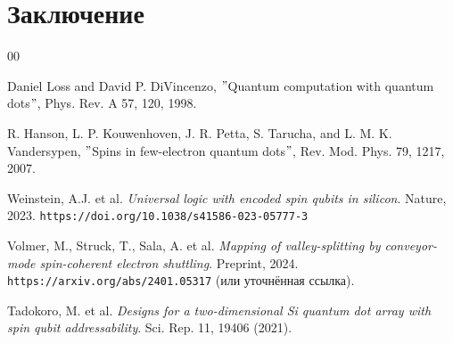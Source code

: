 \documentclass[a4paper,14pt]{extreport} %
\begin{document}

\chapter{Заключение}

\newpage
\begin{thebibliography}{00}

 Daniel Loss and David P. DiVincenzo, $"$Quantum computation with quantum dots$"$, Phys. Rev. A 57, 120, 1998.

 R. Hanson, L. P. Kouwenhoven, J. R. Petta, S. Tarucha, and L. M. K. Vandersypen, $"$Spins in few-electron quantum dots$"$, Rev. Mod. Phys. 79, 1217, 2007.

Weinstein, A.J. et al.
\textit{Universal logic with encoded spin qubits in silicon}.
Nature, 2023. \texttt{https://doi.org/10.1038/s41586-023-05777-3}

Volmer, M., Struck, T., Sala, A. et al.
\textit{Mapping of valley-splitting by conveyor-mode spin-coherent electron shuttling}.
Preprint, 2024. \texttt{https://arxiv.org/abs/2401.05317} (или уточнённая ссылка).

Tadokoro, M. et al. \textit{Designs for a two-dimensional Si quantum dot array with spin qubit addressability}. Sci. Rep. 11, 19406 (2021).


\end{thebibliography}
\end{document}
